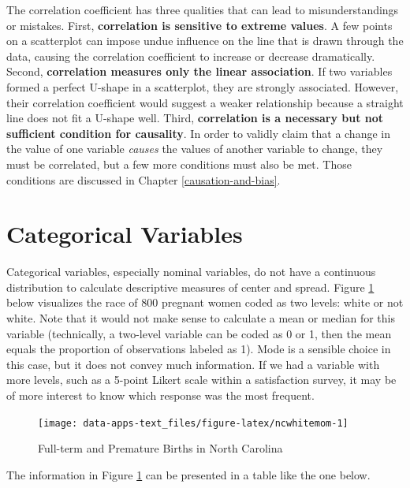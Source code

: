 \documentclass[
]{book}
\begin{document}
The correlation coefficient has three qualities that can lead to misunderstandings or mistakes. First, \textbf{correlation is sensitive to extreme values}. A few points on a scatterplot can impose undue influence on the line that is drawn through the data, causing the correlation coefficient to increase or decrease dramatically. Second, \textbf{correlation measures only the linear association}. If two variables formed a perfect U-shape in a scatterplot, they are strongly associated. However, their correlation coefficient would suggest a weaker relationship because a straight line does not fit a U-shape well. Third, \textbf{correlation is a necessary but not sufficient condition for causality}. In order to validly claim that a change in the value of one variable \emph{causes} the values of another variable to change, they must be correlated, but a few more conditions must also be met. Those conditions are discussed in Chapter \ref{causation-and-bias}.

\hypertarget{categorical-variables}{%
\section{Categorical Variables}\label{categorical-variables}}

Categorical variables, especially nominal variables, do not have a continuous distribution to calculate descriptive measures of center and spread. Figure \ref{fig:ncwhitemom} below visualizes the race of 800 pregnant women coded as two levels: white or not white. Note that it would not make sense to calculate a mean or median for this variable (technically, a two-level variable can be coded as 0 or 1, then the mean equals the proportion of observations labeled as 1). Mode is a sensible choice in this case, but it does not convey much information. If we had a variable with more levels, such as a 5-point Likert scale within a satisfaction survey, it may be of more interest to know which response was the most frequent.

\begin{figure}

{\centering \texttt{[image: data-apps-text\_files/figure-latex/ncwhitemom-1]} 

}

\caption{Full-term and Premature Births in North Carolina}\label{fig:ncwhitemom}
\end{figure}

The information in Figure \ref{fig:ncwhitemom} can be presented in a table like the one below.
\end{document}

